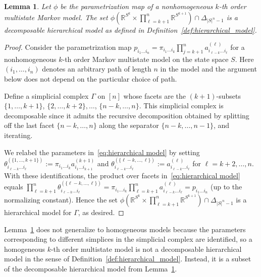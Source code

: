 \documentclass[11pt, a4paper]{article}
\numberwithin{equation}{section}
\theoremstyle{plain}
\newtheorem{lemma}[theorem]{Lemma}
\theoremstyle{definition}
\begin{document}
\begin{lemma}
\label{lem:markov_is_hierarchical}
Let $\phi$ be the parametrization map of a nonhomogeneous $k$-th order multistate Markov model. The set $\phi \left(\textstyle{\mathbb{R}^{S^k} \times \prod_{\ell=k+1}^n \mathbb{R}^{S^{k+1}}}
\right) \cap \Delta_{|S|^n-1}$ is a decomposable
hierarchical model as defined in Definition~\ref{def:hierarchical_model}.
\end{lemma}
\begin{proof}
Consider the parametrization map $\textstyle{p_{i_1 \ldots i_n}= \pi_{i_1 \ldots i_k}\prod_{j=k+1}^n a^{(\ell)}_{i_{\ell-k}\ldots i_{\ell}}}$ for a nonhomogeneous $k$-th order Markov multistate model on the state space $S$.
Here $(i_1,\ldots,i_n)$ denotes an arbitrary path of length $n$ in the model and the argument below does not depend on the particular choice of path.

Define a simplicial complex $\Gamma$ on $[n]$ whose facets are
the $(k+1)$-subsets
$\{1,\ldots,k+1\}$, $\{2,\ldots,k+2\},\ldots$, $\{n-k,\ldots,n\}$.
This simplicial complex is decomposable since it admits the recursive decomposition obtained by
splitting off the last facet $\{n-k,\ldots,n\}$ along the separator $\{n-k,\ldots,n-1\}$,
and iterating.

We relabel the parameters in~\eqref{eq:hierarchical model} by setting $\theta^{(\{1,\ldots,k+1 \})}_{i_{\ell-k}\ldots i_{\ell}} := \pi_{i_1 \ldots i_k} a^{(k+1)}_{i_{1}\ldots i_{k+1}} $ and
$\theta^{(\{\ell-k,\ldots,\ell\})}_{i_{\ell-k}\ldots i_{\ell}} := a^{(\ell)}_{i_{\ell-k}\ldots i_{\ell}} $ for
$\ell=k+2,\ldots,n$.
With these identifications, the product over facets in~\eqref{eq:hierarchical model}
equals $\textstyle{\prod_{\ell=k+1}^n \theta^{(\{\ell-k,\ldots,\ell\})}_{i_{\ell-k}\ldots i_{\ell}}}= \pi_{i_1 \ldots i_k} \textstyle{\prod_{\ell=k+1}^n a^{(\ell)}_{i_{\ell-k}\ldots i_{\ell}}} = p_{i_1\ldots i_n} $ (up to the normalizing constant). 
Hence the set $\phi \left(\textstyle{\mathbb{R}^{S^k} \times \prod_{\ell=k+1}^n \mathbb{R}^{S^{k+1}}}
\right) \cap \Delta_{|S|^n-1}$ is a hierarchical model for $\Gamma$, as desired. 
\end{proof}

Lemma~\ref{lem:markov_is_hierarchical} does not generalize to homogeneous models because the parameters corresponding to different simplices in the simplicial complex are identified, so a homogeneous $k$-th order multistate model is not a decomposable hierarchical model in the sense of Definition~\ref{def:hierarchical_model}. Instead, it is a subset of the decomposable hierarchical model from Lemma~\ref{lem:markov_is_hierarchical}. 
\end{document}
